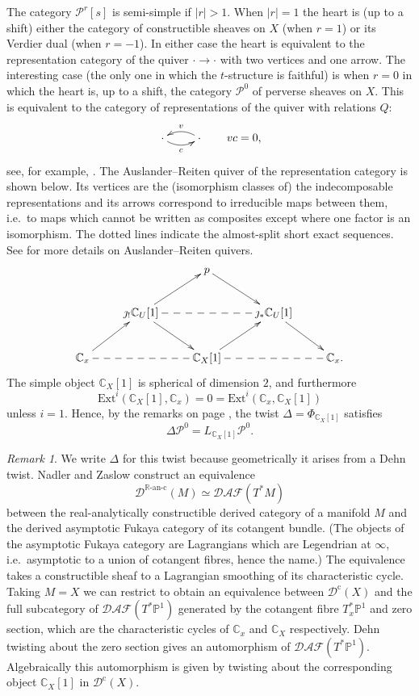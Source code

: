 \documentclass{article}
\theoremstyle{plain}
\theoremstyle{definition}
\theoremstyle{remark}
\newtheorem{remark}[theorem]{Remark}
\newcommand{\ie}{i.e.\ }
\newcommand{\R}{\mathbb{R}}
\newcommand{\C}{\mathbb{C}}
\renewcommand{\P}{\mathbb{P}}
\newcommand{\cat}[1]{\mathcal{#1}}
\newcommand{\perv}[3]{\cat{P}^{#1}_{#3}{[#2]}}
\newcommand{\constr}[1]{\cat{D}^\textrm{c}(#1)}
\newcommand{\constran}[1]{\cat{D}^{\textrm{$\R$-an-c}}(#1)}
\newcommand{\derfuk}[1]{\cat{DAF}(#1)}
\newcommand{\ext}[3]{{\mathrm{Ext}^{#1}}(#2,#3)}
\begin{document}
The category $\perv{r}{s}{}$ is semi-simple if $|r|>1$. When $|r|=1$ the heart is (up to a shift) either the category of constructible sheaves on $X$ (when $r=1$) or its Verdier dual (when $r=-1$). In either case the heart is equivalent to the representation category of the quiver $\cdot \to \cdot$ with two vertices and one arrow. The interesting case (the only one in which the $t$-structure is faithful) is when $r=0$ in which the heart is, up to a shift, the category $\cat{P}^0$ of perverse sheaves on $X$. This is equivalent to the category of representations of the quiver with relations $Q$: 
\begin{equation}
\label{quiver}
\xymatrix{\cdot \ar@/{}_{.5pc}/[r]_c& \cdot \ar@/{}_{.5pc}/[l]_v} \qquad vc=0,
\end{equation}
see, for example, \cite[Chapter 7, \S2.6]{gema}. The Auslander--Reiten quiver of the representation category is shown below. Its vertices are the (isomorphism classes of) the indecomposable representations and its arrows correspond to irreducible maps between them, \ie to maps which cannot be written as composites except where one factor is an isomorphism. The dotted lines indicate the almost-split short exact sequences. See \cite[Chapter VII]{MR1314422} for more details on Auslander--Reiten quivers. 
$$
\xymatrix{
&& p \ar[dr] &&\\
& \jmath_! \C_U[1] \ar[dr] \ar[ur] \ar@{--}[rr] && \jmath_*\C_U[1] \ar[dr] &\\
\C_x \ar[ur] \ar@{--}[rr]&& \C_X[1] \ar[ur]  \ar@{--}[rr]&& \C_x.
}
$$
The simple object $\C_X[1]$ is spherical of dimension $2$, and furthermore $$\ext{i}{\C_X[1]}{\C_x} = 0 = \ext{i}{\C_x}{\C_X[1]}$$ unless $i=1$. Hence, by the remarks on page \pageref{spherical remarks}, the twist $\Delta=\Phi_{\C_X[1]}$ satisfies
$$
\Delta \cat{P}^0 = L_{\C_X[1]} \cat{P}^0.
$$
\begin{remark}
We write $\Delta$ for this twist because geometrically it arises from a Dehn twist. Nadler and Zaslow \cite{Nadler:2006kx} construct an equivalence
$$
\constran{M} \simeq \derfuk{T^*M}
$$ 
between the real-analytically constructible derived category of a manifold $M$ and the derived asymptotic Fukaya category of its cotangent bundle. (The objects of the asymptotic Fukaya category are Lagrangians which are Legendrian at $\infty$, \ie asymptotic to a union of cotangent fibres, hence the name.) The equivalence takes a constructible sheaf to a Lagrangian smoothing of its characteristic cycle. Taking $M=X$ we can restrict to obtain an equivalence between $\constr{X}$ and the full subcategory of $\derfuk{T^*\P^1}$ generated by the cotangent fibre $T_x^*\P^1$ and zero section, which are the characteristic cycles of $\C_x$ and $\C_X$ respectively. Dehn twisting about the zero section gives an automorphism of $\derfuk{T^*\P^1}$. Algebraically this automorphism is given by twisting about the corresponding object $\C_X[1]$ in $\constr{X}$. 
\end{remark}
\end{document}
